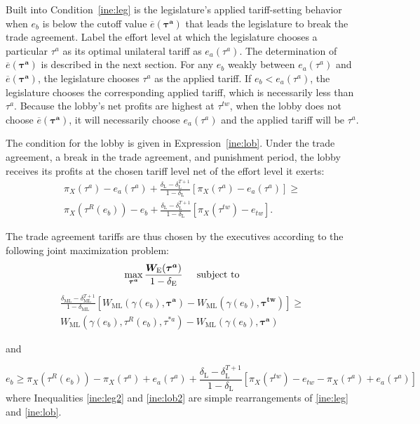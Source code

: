 \documentclass[authoryear, review]{elsarticle}
\newcommand{\ov}{\overline}
\newcommand{\bta}{\bm{\tau^a}}
\newcommand{\ga}{\gamma}
\newcommand{\btw}{\bm{\tau^{tw}}}
\newcommand{\de}{\delta}
\begin{document}
Built into Condition~\ref{ine:leg} is the legislature's applied tariff-setting behavior when $e_b$ is below the cutoff value $\ov{e}(\bta)$ that leads the legislature to break the trade agreement. Label the effort level at which the legislature chooses a particular $\tau^a$ as its optimal unilateral tariff as $e_a(\tau^a)$. The determination of $\ov{e}(\bta)$ is described in the next section. For any $e_b$ weakly between $e_a(\tau^a)$ and $\ov{e}(\bta)$, the legislature chooses $\tau^a$ as the applied tariff. If $e_b < e_a(\tau^a)$, the legislature chooses the corresponding applied tariff, which is necessarily less than $\tau^a$. Because the lobby's net profits are highest at $\tau^{tw}$, when the lobby does not choose $\ov{e}(\bta)$, it will necessarily choose $e_a(\tau^a)$ and the applied tariff will be $\tau^a$.

The condition for the lobby is given in Expression~\ref{ine:lob}. Under the trade agreement, a break in the trade agreement, and punishment period, the lobby receives its profits at the chosen tariff level net of the effort level it exerts:
\begin{multline}
  \pi_X(\tau^a) - e_a(\tau^a) + \frac{\de_\text{L} - \de_\text{L}^{T+1}}{1-\de_\text{L}} \left[\pi_X(\tau^a) - e_a(\tau^a) \right] \geq \\ \pi_X(\tau^R(e_b)) - e_b + \frac{\de_\text{L} - \de_\text{L}^{T+1}}{1-\de_\text{L}} \left[\pi_X(\tau^{tw}) - e_{tw} \right] .
  \label{ine:lob}
\end{multline}

The trade agreement tariffs are thus chosen by the executives according to the following joint maximization problem:
\begin{equation}
  \max_{\bta} \frac{\bm{W_\text{E}}(\bta)}{1-\de_\text{E}} \hskip.2in \text{subject to}
  \label{prob:max}
\end{equation}
\begin{multline}
  \frac{\de_\text{ML} - \de_\text{ML}^{T+1}}{1-\de_\text{ML}} \left[W_\text{ML}(\ga(e_b),\bta) - W_{\text{ML}}(\ga(e_b),\btw) \right] \geq \\
	W_{\text{ML}}(\ga(e_b),\tau^R(e_b),\tau^{*a}) - W_{\text{ML}}(\ga(e_b),\bta)
  \label{ine:leg2}
\end{multline}
\begin{center}
and
\end{center}
\begin{equation}
  e_b \geq \pi_X(\tau^R(e_b)) - \pi_X(\tau^a) + e_a(\tau^a) + \frac{\de_\text{L} - \de_\text{L}^{T+1}}{1-\de_\text{L}} \left[\pi_X(\tau^{tw}) -e_{tw} - \pi_X(\tau^a) + e_a(\tau^a)\right]
  \label{ine:lob2}
\end{equation}
where Inequalities \ref{ine:leg2} and \ref{ine:lob2} are simple rearrangements of \ref{ine:leg} and \ref{ine:lob}.
\end{document}
